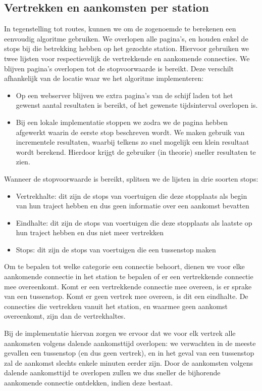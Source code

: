 \subsection{Vertrekken en aankomsten per station}
In tegenstelling tot routes, kunnen we om de zogenoemde  te berekenen een eenvoudig algoritme gebruiken. We overlopen alle pagina's, en houden enkel de stops bij die betrekking hebben op het gezochte station. Hiervoor gebruiken we twee lijsten voor respectievelijk de vertrekkende en aankomende connecties. We blijven pagina's overlopen tot de stopvoorwaarde is bereikt. Deze verschilt afhankelijk van de locatie waar we het algoritme implementeren:
\begin{itemize}
	\item Op een webserver blijven we extra pagina's van de schijf laden tot het gewenst aantal resultaten is bereikt, of het gewenste tijdsinterval overlopen is.
	\item Bij een lokale implementatie stoppen we zodra we de pagina hebben afgewerkt waarin de eerste stop beschreven wordt. We maken gebruik van incrementele resultaten, waarbij telkens zo snel mogelijk een klein resultaat wordt berekend. Hierdoor krijgt de gebruiker (in theorie) sneller resultaten te zien.
\end{itemize}

Wanneer de stopvoorwaarde is bereikt, splitsen we de lijsten in drie soorten stops:
\begin{itemize}
	\item Vertrekhalte:  dit zijn de stops van voertuigen die deze stopplaats als begin van hun traject hebben en dus geen informatie over een aankomst bevatten
	\item Eindhalte: dit zijn de stops van voertuigen die deze stopplaats als laatste op hun traject hebben en dus niet meer vertrekken
	\item Stops: dit zijn de stops van voertuigen die een tussenstop maken
\end{itemize}

Om te bepalen tot welke categorie een connectie behoort, dienen we voor elke aankomende connectie in het station te bepalen of er een vertrekkende connectie mee overeenkomt. Komt er een vertrekkende connectie mee overeen, is er sprake van een tussenstop. Komt er geen vertrek mee overeen, is dit een eindhalte. De connecties die vertrekken vanuit het station, en waarmee geen aankomst overeenkomt, zijn dan de vertrekhaltes. 

Bij de implementatie hiervan zorgen we ervoor dat we voor elk vertrek alle aankomsten volgens dalende aankomsttijd overlopen: we verwachten in de meeste gevallen een tussenstop (en dus geen vertrek), en in het geval van een tussenstop zal de aankomst slechts enkele minuten eerder zijn. Door de aankomsten volgens dalende aankomsttijd te overlopen zullen we dus sneller de bijhorende aankomende connectie ontdekken, indien deze bestaat.

